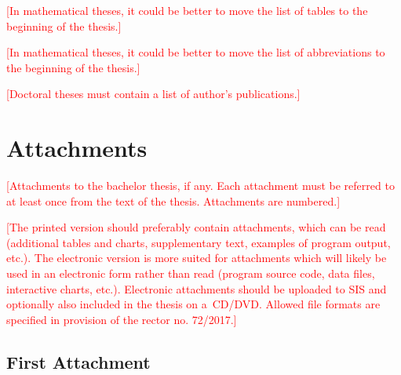 \documentclass[12pt,a4paper]{report}
\let\openright=\clearpage
\def\XXX#1{\par\smallskip\noindent \textcolor{red}{[#1]}}
\begin{document}



\tableofcontents














\listoffigures

\listoftables
\XXX{In mathematical theses, it could be better to move the list of tables to the beginning of the thesis.}

\XXX{In mathematical theses, it could be better to move the list of abbreviations to the beginning of the thesis.}

\XXX{Doctoral theses must contain a list of author's publications.}

\appendix
\chapter{Attachments}
\XXX{Attachments to the bachelor thesis, if any. Each attachment must be referred to at least once from the text of the thesis. Attachments are numbered.}
\XXX{The printed version should preferably contain attachments, which can be read (additional tables and charts, supplementary text, examples of program output, etc.). The electronic version is more suited for attachments which will likely be used in an electronic form rather than read (program source code, data files, interactive charts, etc.). Electronic attachments should be uploaded to SIS and optionally also included in the thesis on a~CD/DVD. Allowed file formats are specified in provision of the rector no. 72/2017.}

\section{First Attachment}

\openright
\end{document}
